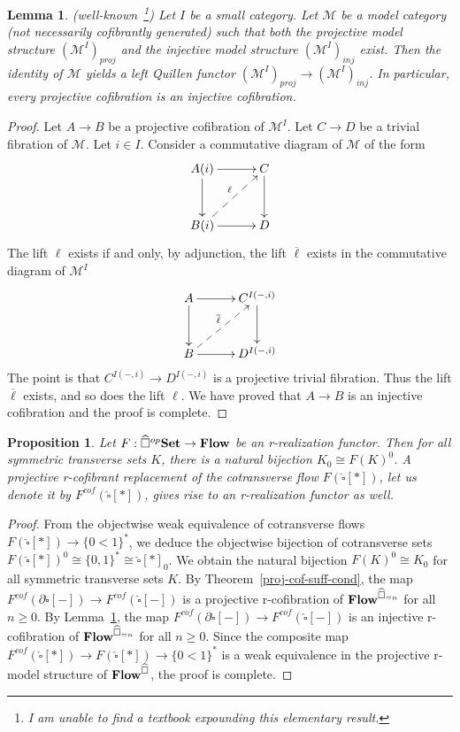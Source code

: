 \documentclass[a4paper,12pt]{amsart}
\makeatletter
\newcommand{\de}{\partial}
\newtheorem{prop}[thm]{Proposition}
\newtheorem{lem}[thm]{Lemma}
\newcommand{\bp}{\begin{prop}}
\newcommand{\ep}{\end{prop}}
\newcommand{\bpf}{\begin{proof}}
\newcommand{\epf}{\end{proof}}
\theoremstyle{definition}
\newcommand{\fr}[1]{\ar@{->}[r]^-{#1}}
\newcommand{\fd}[1]{\ar@{->}[d]_-{#1}}
\newcommand{\iso}{\cong}
\renewcommand{\geq}{\geqslant}
\newcommand{\brm}[1]{{\rm{\mathbf{#1}}}}
\newcommand{\dtop}{{\brm{Flow}}}
\newcommand{\set}{{\brm{Set}}}
\makeatother
\begin{document}
\begin{lem} (well-known~\footnote{I am unable to find a textbook expounding this elementary result.}) \label{proj-inj}
	Let $I$ be a small category. Let $\mathcal{M}$ be a model category (not necessarily cofibrantly generated) such that both the projective model structure $(\mathcal{M}^I)_{proj}$ and the injective model structure $(\mathcal{M}^I)_{inj}$ exist. Then the identity of $\mathcal{M}$ yields a left Quillen functor $(\mathcal{M}^I)_{proj}\to (\mathcal{M}^I)_{inj}$. In particular, every projective cofibration is an injective cofibration.
\end{lem}

\bpf 
Let $A\to B$ be a projective cofibration of $\mathcal{M}^I$. Let $C\to D$ be a trivial fibration of $\mathcal{M}$. Let $i\in I$. Consider a commutative diagram of $\mathcal{M}$ of the form 
\[
\xymatrix@C=3em@R=3em
{
A(i) \fr{} \fd{} & C \fd{} \\
B(i) \fr{} \ar@{-->}[ru]^-{\ell}& D
}
\]
The lift $\ell$ exists if and only, by adjunction, the lift $\overline{\ell}$ exists in the commutative diagram of $\mathcal{M}^I$
\[
\xymatrix@C=3em@R=3em
{
	A \fr{} \fd{} & C^{I(-,i)} \fd{} \\
	B \fr{} \ar@{-->}[ru]^-{\overline{\ell}}& D^{I(-,i)}
}
\]
The point is that $C^{I(-,i)}\to D^{I(-,i)}$ is a projective trivial fibration. Thus the lift $\overline{\ell}$ exists, and so does the lift $\ell$. We have proved that $A\to B$ is an injective cofibration and the proof is complete.
\epf


\bp \label{elm}
Let $F:\widehat{\square}^{op}\set \to \dtop$ be an r-realization functor. Then for all symmetric transverse sets $K$, there is a natural bijection $K_0\iso F(K)^0$. A projective r-cofibrant replacement of the cotransverse flow $F(\widehat{\square}[*])$, let us denote it by $F^{cof}(\widehat{\square}[*])$, gives rise to an r-realization functor as well.
\ep

\bpf 
From the objectwise weak equivalence of cotransverse flows $F(\widehat{\square}[*])\to \{0<1\}^*$, we deduce the objectwise bijection of cotransverse sets $F(\widehat{\square}[*])^0\iso \{0,1\}^* \iso \widehat{\square}[*]_0$. We obtain the natural bijection $F(K)^0 \iso K_0$ for all symmetric transverse sets $K$. By Theorem~\ref{proj-cof-suff-cond}, the map $F^{cof}(\de\widehat{\square}[-])\to F^{cof}(\widehat{\square}[-])$ is a projective r-cofibration of $\dtop^{\widehat{\square}_{=n}}$ for all $n\geq 0$. By Lemma~\ref{proj-inj}, the map $F^{cof}(\de\widehat{\square}[-])\to F^{cof}(\widehat{\square}[-])$ is an injective r-cofibration of $\dtop^{\widehat{\square}_{=n}}$ for all $n\geq 0$. Since the composite map $F^{cof}(\widehat{\square}[*])\longrightarrow F(\widehat{\square}[*])\longrightarrow \{0<1\}^*$ is a weak equivalence in the projective r-model structure of $\dtop^{\widehat{\square}}$, the proof is complete.
\epf
\end{document}

